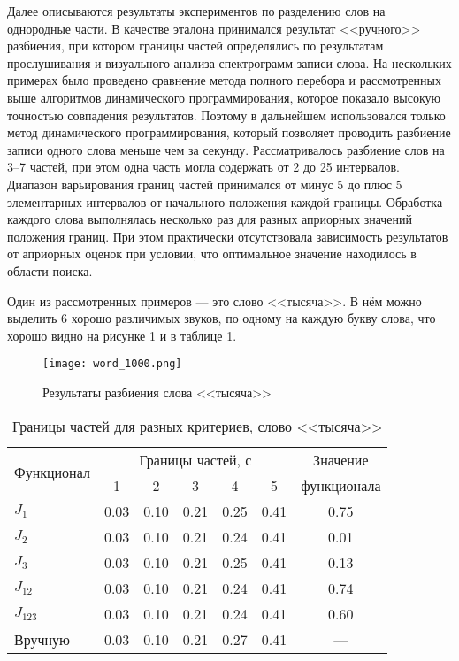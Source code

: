 Далее описываются результаты экспериментов по разделению слов на однородные части.
В качестве эталона принимался результат <<ручного>> разбиения, при котором границы частей определялись по результатам прослушивания и визуального анализа спектрограмм записи слова.
На нескольких примерах было проведено сравнение метода полного перебора и рассмотренных выше алгоритмов динамического программирования, которое показало высокую точностью совпадения результатов.
Поэтому в дальнейшем использовался только метод динамического программирования, который позволяет проводить разбиение записи одного слова меньше чем за секунду.
Рассматривалось разбиение слов на 3--7 частей, при этом одна часть могла содержать от 2 до 25 интервалов.
Диапазон варьирования границ частей принимался от минус 5 до плюс 5 элементарных интервалов от начального положения каждой границы.
Обработка каждого слова выполнялась несколько раз для разных априорных значений положения границ.
При этом практически отсутствовала зависимость результатов от априорных оценок при условии, что оптимальное значение находилось в области поиска. 

Один из рассмотренных примеров --- это слово <<тысяча>>.
В нём можно выделить 6 хорошо различимых звуков, по одному на каждую букву слова, что хорошо видно на рисунке \ref{fig:3_1} и в таблице \ref{tab:3_1}.
\begin{figure}[h]
	\centering
	\texttt{[image: word\_1000.png]}
	\caption{Результаты разбиения слова <<тысяча>>}
	\label{fig:3_1}
\end{figure}

\begin{table}[h]
	\centering
	\caption{Границы частей для разных критериев, слово <<тысяча>>}
	\label{tab:3_1}
	\begin{tabular}{| l | c | c | c | c | c | c |}
		\hline
		\multirow{2}{*}{Функционал} & \multicolumn{5}{c|}{Границы частей, с} & Значение \\
		\hhline{~-----~} & \phantom{00}1\phantom{00} & \phantom{00}2\phantom{00} & \phantom{00}3\phantom{00} & \phantom{00}4\phantom{00} & \phantom{00}5\phantom{00} & \phantom{0}функционала\phantom{0} \\
		\hline
		$J_{1}$		& 0.03 & 0.10 & 0.21 & 0.25 & 0.41 & 0.75 \\
		$J_{2}$		& 0.03 & 0.10 & 0.21 & 0.24 & 0.41 & 0.01 \\
		$J_{3}$		& 0.03 & 0.10 & 0.21 & 0.25 & 0.41 & 0.13 \\
		$J_{12}$	& 0.03 & 0.10 & 0.21 & 0.24 & 0.41 & 0.74 \\
		$J_{123}$	& 0.03 & 0.10 & 0.21 & 0.24 & 0.41 & 0.60 \\
		\hline
		Вручную		& 0.03 & 0.10 & 0.21 & 0.27 & 0.41 & --- \\
		\hline
	\end{tabular}
\end{table}

